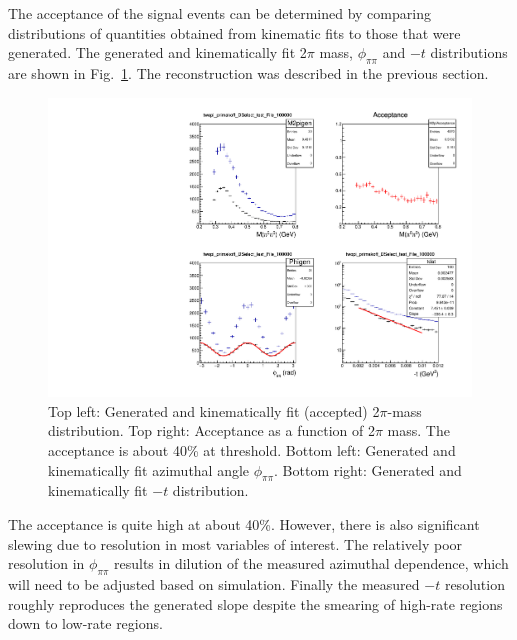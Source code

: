 The acceptance of the signal events can be determined by comparing
distributions of quantities obtained from kinematic fits to those
that were generated. The generated and
kinematically fit 2$\pi$ mass, $\phi_{\pi\pi}$ and $-t$ distributions
are shown in
Fig.~\ref{fig:twopi_primakoff_DSelect_p1_W_100000_sum}. The
reconstruction was described in the previous section.
\begin{figure}[tph]
\centering
\includegraphics[width=6in]{figures/twopi_primakoff_DSelect_test_File_100000_sum_PrimNC.pdf}
\caption{Top left: Generated and kinematically fit (accepted)
  2$\pi$-mass distribution. Top right: Acceptance as a function of
  2$\pi$ mass. The acceptance is about 40\% at threshold. Bottom left:
  Generated and kinematically fit azimuthal angle
  $\phi_{\pi\pi}$. Bottom right: Generated and kinematically fit $-t$
  distribution.}
\label{fig:twopi_primakoff_DSelect_p1_W_100000_sum}
\end{figure}
The acceptance is quite high at about 40\%. However, there is also
significant slewing due to resolution in most variables of
interest.  The
relatively poor resolution in $\phi_{\pi\pi}$ results in dilution of
the measured azimuthal dependence, which will need to be adjusted
based on simulation. Finally the measured $-t$ resolution roughly
reproduces the generated slope despite the smearing of
high-rate regions down to low-rate regions.
